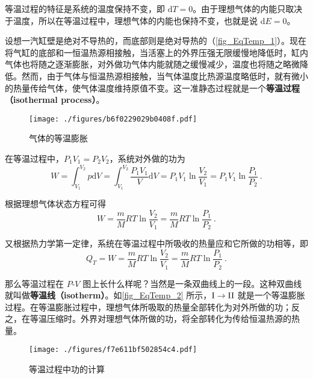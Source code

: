 

等温过程的特征是系统的温度保持不变，即 $\mathrm dT=0$。由于理想气体的内能只取决于温度，所以在等温过程中，理想气体的内能也保持不变，也就是说 $\mathrm dE=0$。

设想一汽缸壁是绝对不导热的，而底部则是绝对导热的（\autoref{fig_EqTemp_1}）。现在将气缸的底部和一恒温热源相接触，当活塞上的外界压强无限缓慢地降低时，缸内气体也将随之逐渐膨胀，对外做功气体内能就随之缓慢减少，温度也将随之略微降低。然而，由于气体与恒温热源相接触，当气体温度比热源温度略低时，就有微小的热量传给气体，使气体温度维持原值不变。这一准静态过程就是一个\textbf{等温过程（isothermal process）}。
\begin{figure}[ht]
\centering
\texttt{[image: ./figures/b6f0229029b0408f.pdf]}
\caption{气体的等温膨胀} \label{fig_EqTemp_1}
\end{figure}

在等温过程中，$P_1V_1=P_2V_2$，系统对外做的功为
\begin{equation}
W= \int_{V_{1}}^{V_{2}} p \mathrm{d} V=\int_{V_{1}}^{V_{2}} \frac{P_{1} V_{1}}{V} \mathrm{d} V=P_{1} V_{1} \ln \frac{V_{2}}{V_{1}}=P_{1} V_{1} \ln \frac{P_{1}}{P_{2}}~.
\end{equation}

根据理想气体状态方程可得
\begin{equation}
W=\frac{m}{M} R T \ln \frac{V_{2}}{V_{1}}=\frac{m}{M} R T \ln \frac{P_{1}}{P_{2}}~.
\end{equation}

又根据热力学第一定律，系统在等温过程中所吸收的热量应和它所做的功相等，即
\begin{equation}\label{eq_EqTemp_1}
Q_{T}=W=\frac{m}{M} R T \ln \frac{V_{2}}{V_{1}}=\frac{m}{M} R T \ln \frac{P_{1}}{P_{2}}~.
\end{equation}

那么等温过程在 $P$-$V$ 图上长什么样呢？当然是一条双曲线上的一段。这种双曲线就叫做\textbf{等温线（isotherm）}。如\autoref{fig_EqTemp_2} 所示，$\rm I\to II$ 就是一个等温膨胀过程。在等温膨胀过程中，理想气体所吸取的热量全部转化为对外所做的功；反之，在等温压缩时。外界对理想气体所做的功，将全部转化为传给恒温热源的热量。

\begin{figure}[ht]
\centering
\texttt{[image: ./figures/f7e611bf502854c4.pdf]}
\caption{等温过程中功的计算} \label{fig_EqTemp_2}
\end{figure}
